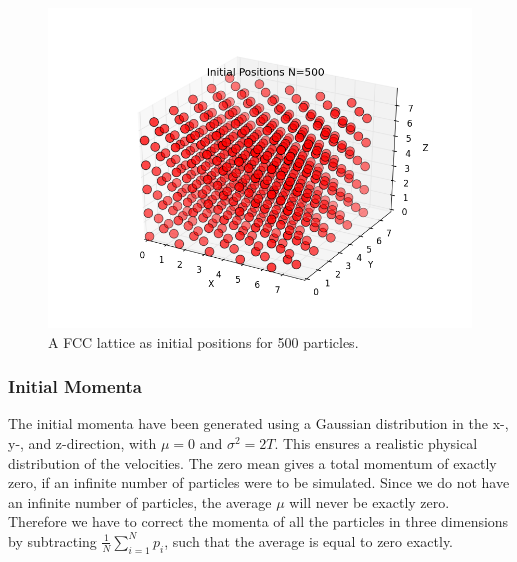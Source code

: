\documentclass[a4paper,twoside,12pt]{article}
\begin{document}
\begin{figure}[h]
\centering
\includegraphics[scale=0.4]{figures/initial_positions_500.png}
\caption{A FCC lattice as initial positions for 500 particles.}
\label{fig:ini_pos_500}
\end{figure} 

\subsubsection{Initial Momenta}

\noindent The initial momenta have been generated using a Gaussian distribution in the x-, y-, and z-direction, with $\mu=0$ and $\sigma^{2}=2T$. This ensures a realistic physical distribution of the velocities. The zero mean gives a total momentum of exactly zero, if an infinite number of particles were to be simulated. Since we do not have an infinite number of particles, the average $\mu$ will never be exactly zero. Therefore we have to correct the momenta of all the particles in three dimensions by subtracting $\frac{1}{N}\sum_{i=1}^{N} p_{i}$, such that the average is equal to zero exactly. 
\end{document}
